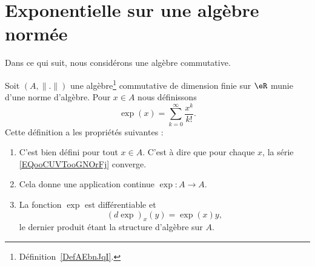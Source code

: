 
\section{Exponentielle sur une algèbre normée}

Dans ce qui suit, nous considérons une algèbre commutative.
\begin{propositionDef}       \label{DEFooSFDUooMNsgZY}
    Soit \( (A,\| . \|)\) une algèbre\footnote{Définition~\ref{DefAEbnJqI}.} commutative de dimension finie sur \( \eR\) munie d'une norme d'algèbre. Pour \( x\in A\) nous définissons
    \begin{equation}        \label{EQooCUVTooGNOrFj}
        \exp(x)=\sum_{k=0}^{\infty}\frac{ x^k }{ k! }.
    \end{equation}
    Cette définition a les propriétés suivantes :
    \begin{enumerate}
        \item
            C'est bien défini pour tout \( x\in A\). C'est à dire que pour chaque \( x\), la série \eqref{EQooCUVTooGNOrFj} converge.
        \item
            Cela donne une application continue \( \exp\colon A\to A\).
        \item       \label{ITEMooGGVAooVfhGuu}
            La fonction \( \exp\) est différentiable et
            \begin{equation}        \label{EQooKWBUooLUdBAw}
                (d\exp)_x(y)=\exp(x)y,
            \end{equation}
            le dernier produit étant la structure d'algèbre sur \( A\).
    \end{enumerate}
\end{propositionDef}

